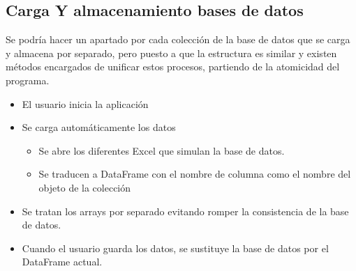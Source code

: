 \subsection{Carga Y almacenamiento bases de datos}
Se podría hacer un apartado por cada colección de la base de datos que se carga y almacena por separado, pero puesto a que la estructura es similar y existen métodos encargados de unificar estos procesos, partiendo de la atomicidad del programa.
\begin{itemize}
\item El usuario inicia la aplicación
\item Se carga automáticamente los datos
\begin{itemize}
\item Se abre los diferentes Excel que simulan la base de datos.
\item Se traducen a DataFrame con el nombre de columna como el nombre del objeto de la colección
\end{itemize}
\item Se tratan los arrays por separado evitando romper la consistencia de la base de datos.
\item Cuando el usuario guarda los datos, se sustituye la base de datos por el DataFrame actual.
\end{itemize}
